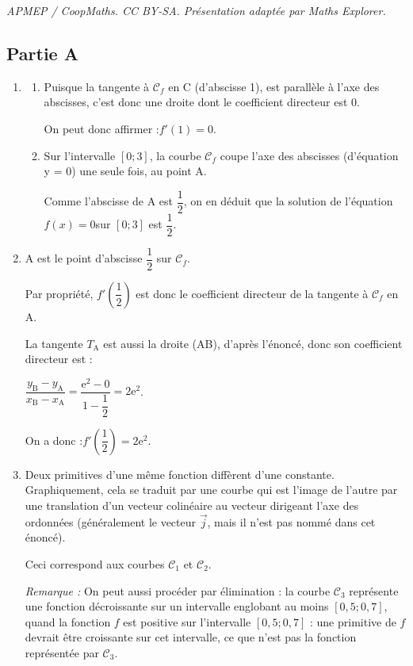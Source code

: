 \documentclass[10pt]{article}
\providecommand{\e}{{\mathrm{e}}}
\providecommand{\vect}[1]{\overrightarrow{#1}}
\begin{document}
\noindent\textit{APMEP / CoopMaths. CC BY-SA. Présentation adaptée par Maths Explorer.}\par\medskip
\subsection*{Partie A}
	\begin{enumerate}
		\item \begin{enumerate}
			\item Puisque la tangente à $\mathcal{C}_f$ en C (d'abscisse 1), est parallèle à l'axe des abscisses, c'est donc une droite dont le coefficient directeur est 0.

			On peut donc affirmer :\quad $f'(1) = 0$.

			\item Sur l'intervalle $[0 ; 3]$, la courbe $\mathcal{C}_f$ coupe l'axe des abscisses (d'équation y = 0) une seule fois, au point A.

			Comme l'abscisse de A est $\dfrac{1}{2}$, on en déduit que la solution de l'équation \quad $f(x) = 0$\quad sur $[0 ; 3]$ est $\dfrac{1}{2}$.
		\end{enumerate}

		\item A est le point d'abscisse $\dfrac{1}{2}$ sur $\mathcal{C}_f$.

		Par propriété, $f'\left(\dfrac{1}{2}\right)$ est donc le coefficient directeur de la tangente à $\mathcal{C}_f$ en A.

		La tangente $T_{\mathrm{A}}$ est aussi la droite (AB), d'après l'énoncé, donc son coefficient directeur est :

		$\dfrac{y_{\mathrm{B}} - y_{\mathrm{A}}}{x_{\mathrm{B}}-x_{\mathrm{A}}} = \dfrac{\e^2 - 0}{1 - \dfrac{1}{2}} = 2\e^2$.

		On a donc :\quad $f'\left(\dfrac{1}{2}\right) = 2\e^2$.

		\item Deux primitives d'une même fonction diffèrent d'une constante. Graphiquement, cela se traduit par une courbe qui est l'image de l'autre par une translation d'un vecteur colinéaire au vecteur dirigeant l'axe des ordonnées (généralement le vecteur $\vect{j}$, mais il n'est pas nommé dans cet énoncé).

		Ceci correspond aux courbes $\mathcal{C}_1$ et $\mathcal{C_2}$.

		\emph{Remarque :} On peut aussi procéder par élimination : la courbe $\mathcal{C}_3$ représente une fonction décroissante sur un intervalle englobant au moins $[0,5 ; 0,7]$, quand la fonction $f$ est positive sur l'intervalle $[0,5 ; 0,7]$ : une primitive de $f$ devrait être croissante sur cet intervalle, ce que n'est pas la fonction représentée par $\mathcal{C}_3$.
	\end{enumerate}
\end{document}
